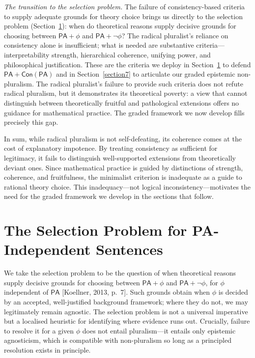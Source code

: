 \documentclass[a4paper,12pt]{amsart}
\theoremstyle{definition}
\numberwithin{equation}{section}
\begin{document}
\emph{The transition to the selection problem.} The failure of consistency-based criteria to supply adequate grounds for theory choice brings us directly to the selection problem (Section~\ref{section6}): when do theoretical reasons supply decisive grounds for choosing between \(\mathsf{PA} + \phi\) and \(\mathsf{PA} + \neg \phi\)? The radical pluralist's reliance on consistency alone is insufficient; what is needed are substantive criteria---interpretability strength, hierarchical coherence, unifying power, and philosophical justification. These are the criteria we deploy in Section~\ref{section6} to defend \(\mathsf{PA} + \mathsf{Con}(\mathsf{PA})\) and in Section~\ref{section7} to articulate our graded epistemic non-pluralism. The radical pluralist's failure to provide such criteria does not refute radical pluralism, but it demonstrates its theoretical poverty: a view that cannot distinguish between theoretically fruitful and pathological extensions offers no guidance for mathematical practice. The graded framework we now develop fills precisely this gap.

In sum, while radical pluralism is not self-defeating, its coherence comes at the cost of explanatory impotence. By treating consistency as sufficient for legitimacy, it fails to distinguish well-supported extensions from theoretically deviant ones. Since mathematical practice is guided by distinctions of strength, coherence, and fruitfulness, the minimalist criterion is inadequate as a guide to rational theory choice. This inadequacy---not logical inconsistency---motivates the need for the graded framework we develop in the sections that follow. 

\section{The Selection Problem for {\sf PA}-Independent Sentences}\label{section6}
We take the selection problem to be the question of when theoretical reasons supply decisive grounds for choosing between \(\mathsf{PA}+\phi\) and \(\mathsf{PA}+\neg\phi\), for \(\phi\) independent of \(\mathsf{PA}\) [Koellner, 2013, p.~7].  Such grounds obtain when \(\phi\) is decided by an accepted, well-justified background framework; where they do not, we may legitimately remain agnostic. The selection problem is not a universal imperative but a localised heuristic for identifying where evidence runs out. Crucially, failure to resolve it for a given \(\phi\) does not entail pluralism—it entails only epistemic agnosticism, which is compatible with non-pluralism so long as a principled resolution exists in principle.
 
\end{document}
